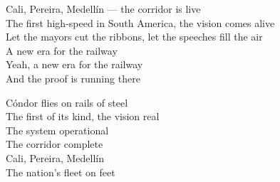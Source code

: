 \begin{lyrics}
Cali, Pereira, Medellín — the corridor is live\\
The first high-speed in South America, the vision comes alive\\
Let the mayors cut the ribbons, let the speeches fill the air\\
A new era for the railway\\
Yeah, a new era for the railway\\
And the proof is running there

Cóndor flies on rails of steel\\
The first of its kind, the vision real\\
The system operational\\
The corridor complete\\
Cali, Pereira, Medellín\\
The nation's fleet on feet
\end{lyrics}

